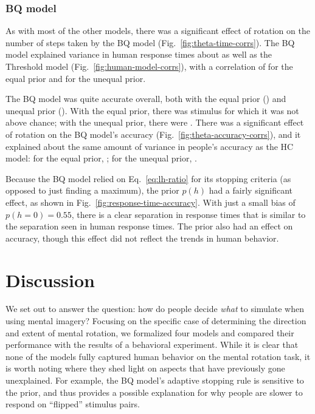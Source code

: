\documentclass[10pt,letterpaper]{article}
\newcommand{\Th}[0]{Threshold}
\newcommand{\Hc}[0]{HC}
\newcommand{\Bq}[0]{BQ}
\begin{document}
\subsubsection{\Bq{} model}

As with most of the other models, there was a significant effect of
rotation on the number of steps taken by the \Bq{} model
(Fig.~\ref{fig:theta-time-corrs}). The \Bq{} model explained variance
in human response times about as well as the \Th{} model
(Fig.~\ref{fig:human-model-corrs}), with a correlation of
\BqTimeCorr{} for the equal prior and \BqpTimeCorr{} for the unequal
prior.  

The \Bq{} model was quite accurate overall, both with the equal prior
(\BqAccuracy{}) and unequal prior (\BqpAccuracy{}). With the equal
prior, there was \BqNumChance{} stimulus for which it was not above
chance; with the unequal prior, there were \BqpNumChance{}. There was
a significant effect of rotation on the \Bq{} model's accuracy
(Fig.~\ref{fig:theta-accuracy-corrs}), and it explained about the same
amount of variance in people's accuracy as the \Hc{} model: for the
equal prior, \BqAccuracyCorr{}; for the unequal prior,
\BqpAccuracyCorr{}.

Because the \Bq{} model relied on Eq.~\ref{eq:lh-ratio} for its
stopping criteria (as opposed to just finding a maximum), the prior
$p(h)$ had a fairly significant effect, as shown in
Fig.~\ref{fig:response-time-accuracy}. With just a small bias of
$p(h=0)=0.55$, there is a clear separation in response times that is
similar to the separation seen in human response times. The prior also
had an effect on accuracy, though this effect did not reflect the
trends in human behavior.

\section{Discussion}

We set out to answer the question: how do people decide \textit{what}
to simulate when using mental imagery? Focusing on the specific case
of determining the direction and extent of mental rotation, we
formalized four models and compared their performance with the results
of a behavioral experiment. While it is clear that none of the models
fully captured human behavior on the mental rotation task, it is worth
noting where they shed light on aspects that have previously gone
unexplained.  For example, the \Bq{} model's adaptive stopping rule is
sensitive to the prior, and thus provides a possible explanation for
why people are slower to respond on ``flipped'' stimulus pairs.
\end{document}
